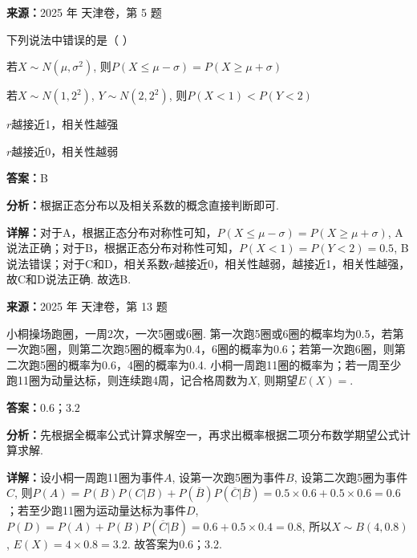 \begin{question}[points=5]
\textbf{来源：}2025 年 天津卷，第 5 题\par
下列说法中错误的是（   ）
\begin{choices}
  \item 若$X \sim N(\mu, \sigma^2)$, 则$P(X \le \mu - \sigma) = P(X \ge \mu + \sigma)$
  \item 若$X \sim N(1, 2^2)$, $Y \sim N(2, 2^2)$, 则$P(X < 1) < P(Y < 2)$
  \item $r$越接近1，相关性越强
  \item $r$越接近0，相关性越弱
\end{choices}
\begin{solution}
\textbf{答案：}B

\textbf{分析：}根据正态分布以及相关系数的概念直接判断即可.

\textbf{详解：}对于A，根据正态分布对称性可知，$P(X \le \mu - \sigma) = P(X \ge \mu + \sigma)$, A说法正确；对于B，根据正态分布对称性可知，$P(X < 1) = P(Y < 2) = 0.5$, B说法错误；对于C和D，相关系数$r$越接近0，相关性越弱，越接近1，相关性越强，故C和D说法正确. 故选B.
\end{solution}
\end{question}

\begin{question}[points=5]
\textbf{来源：}2025 年 天津卷，第 13 题\par
小桐操场跑圈，一周2次，一次5圈或6圈. 第一次跑5圈或6圈的概率均为0.5，若第一次跑5圈，则第二次跑5圈的概率为0.4，6圈的概率为0.6；若第一次跑6圈，则第二次跑5圈的概率为0.6，4圈的概率为0.4. 小桐一周跑11圈的概率为；若一周至少跑11圈为动量达标，则连续跑4周，记合格周数为$X$, 则期望$E(X) = $.
\fillin[{$0.6；3.2$}]
\begin{solution}
\textbf{答案：}$0.6；3.2$

\textbf{分析：}先根据全概率公式计算求解空一，再求出概率根据二项分布数学期望公式计算求解.

\textbf{详解：}设小桐一周跑11圈为事件$A$, 设第一次跑5圈为事件$B$, 设第二次跑5圈为事件$C$, 则$P(A) = P(B)P(C|B) + P(\overline{B})P(\overline{C}|\overline{B}) = 0.5 \times 0.6 + 0.5 \times 0.6 = 0.6$；若至少跑11圈为运动量达标为事件$D$, $P(D) = P(A) + P(B)P(\overline{C}|B) = 0.6 + 0.5 \times 0.4 = 0.8$, 所以$X \sim B(4, 0.8)$, $E(X) = 4 \times 0.8 = 3.2$. 故答案为0.6；3.2.
\end{solution}
\end{question}

